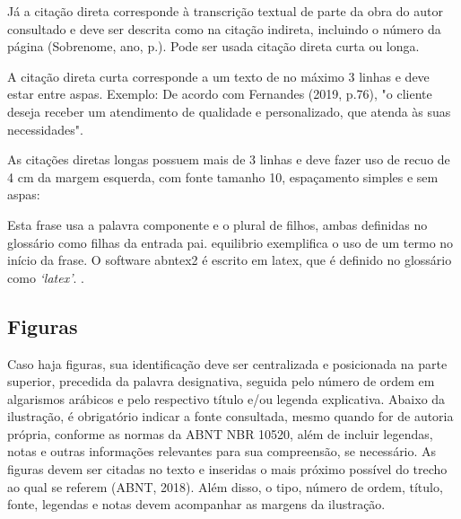 \documentclass[
	article,             %
	12pt,                %
	oneside,             %
	a4paper,             %
	english,             %
	brazil,              %
	sumario=tradicional
]{abntex2}
\begin{document}
Já a citação direta corresponde à transcrição textual de parte da obra do autor consultado e deve ser descrita como na citação indireta, incluindo o número da página (Sobrenome, ano, p.). Pode ser usada citação direta curta ou longa.

A citação direta curta corresponde a um texto de no máximo 3 linhas e deve estar entre aspas. Exemplo: De acordo com Fernandes (2019, p.76), "o cliente deseja receber um atendimento de qualidade e personalizado, que atenda às suas necessidades".

As citações diretas longas possuem mais de 3 linhas e deve fazer uso de recuo de 4 cm da margem esquerda, com fonte tamanho 10, espaçamento simples e sem aspas:

\begin{citacao}
Esta frase usa a palavra \gls{componente} e o plural de \glspl{filho}, ambas
definidas no glossário como filhas da entrada \gls{pai}. \Gls{equilibrio}
exemplifica o uso de um termo no início da frase. O software \gls{abntex2} é
escrito em \gls{latex}, que é definido no glossário como
\emph{`\glsdesc*{latex}'}. \cite{abntex2-wiki-como-customizar}.
\end{citacao}



\subsection{Figuras}

Caso haja figuras, sua identificação deve ser centralizada e posicionada na parte superior, precedida da palavra designativa, seguida pelo número de ordem em algarismos arábicos e pelo respectivo título e/ou legenda explicativa. Abaixo da ilustração, é obrigatório indicar a fonte consultada, mesmo quando for de autoria própria, conforme as normas da ABNT NBR 10520, além de incluir legendas, notas e outras informações relevantes para sua compreensão, se necessário. As figuras devem ser citadas no texto e inseridas o mais próximo possível do trecho ao qual se referem (ABNT, 2018). Além disso, o tipo, número de ordem, título, fonte, legendas e notas devem acompanhar as margens da ilustração.
\end{document}

